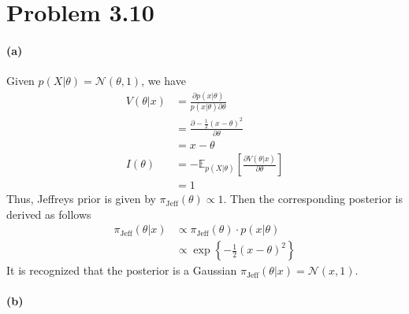 \section{Problem 3.10}
\paragraph{(a)}
Given $p(X \vert \theta) = \mathcal{N}(\theta, 1)$, we have
\begin{align*}
    V(\theta \vert x) 
    &= \frac{\partial p(x \vert \theta)}{p(x \vert \theta) \partial \theta}\\
    &= \frac {\partial -\frac{1}{2}(x - \theta)^2} {\partial \theta}\\
    &= x - \theta\\
    I(\theta) 
    &= -\mathbb{E}_{p(X \vert \theta)} \left[ \frac{\partial V(\theta \vert x)}{\partial \theta}\right]\\
    &= 1
\end{align*}
Thus, Jeffreys prior is given by $\pi_\mathrm{Jeff}(\theta) \propto 1$. Then the corresponding posterior is derived as follows
\begin{align*}
    \pi_\mathrm{Jeff} (\theta \vert x)
    &\propto \pi_\mathrm{Jeff} (\theta) \cdot p(x \vert \theta)\\
    &\propto \exp \left\{ -\frac{1}{2} (x - \theta)^2 \right\}
\end{align*}
It is recognized that the posterior is a Gaussian $\pi_\mathrm{Jeff} (\theta \vert x) = \mathcal{N}(x, 1)$.

\paragraph{(b)}
